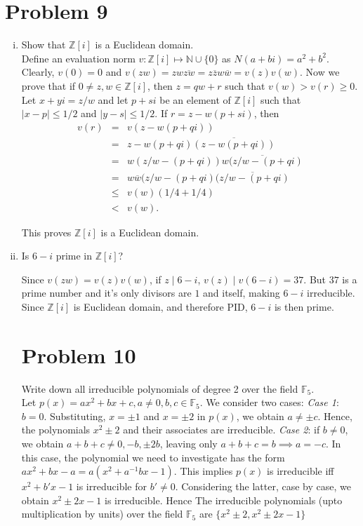 \documentclass[12pt]{article}
\begin{document}
\section*{Problem 9}
\begin{enumerate} [(i)]
    \item  Show that $\mathbb{Z}[i]$ is a Euclidean domain. \\ 

    \noindent Define an evaluation norm $v:\mathbb{Z}[i] \mapsto \mathbb{N} \cup \{0\}$ as $N(a + bi) = a^2 + b^2.$ Clearly, $v (0) = 0$ and $v(zw) = zw\overline{zw} = z\overline{z}w\overline{w} = v(z)v(w)$. Now we prove that if  $0 \neq z, w \in \mathbb{Z}[i]$, then $z = qw + r$ such that $v(w) > v(r) \geq 0.$  Let $x + yi = z/w$ and let $p + si$ be an element of $\mathbb{Z}[i]$ such that $|x - p| \leq 1/2$ and  $|y - s| \leq 1/2$. If $r = z - w(p + si)$, then
    \begin{eqnarray*}
        v(r) & = & v(z - w(p + qi)) \\
         & = & z - w(p + qi)\overline{(z - w(p + qi))}\\
         & = & w(z/w - (p + qi))\overline{w(z/w - (p + qi)}\\
         & = & w\overline{w}(z/w - (p + qi)\overline{(z/w - (p + qi)}\\
         & \leq &v(w)(1/4  + 1/4)\\
         & < & v(w).
    \end{eqnarray*}

    This proves  $\mathbb{Z}[i]$ is a Euclidean domain.

    \item  Is $6 - i$ prime in $\mathbb{Z}[i]$?

    Since $v(zw) = v(z)v(w)$, if $z \mid 6 - i$, $v(z) \mid v(6 - i) = 37$. But $37$ is a prime number and it's only divisors are $1$ and itself, making $6 - i$ irreducible. Since $\mathbb{Z}[i]$ is Euclidean domain, and therefore PID, $6 - i$ is then prime.

    \newcommand{\bb}[2]{\mathbb{#1}_{#2}}
    \section*{Problem 10}
    Write down all irreducible polynomials of degree 2 over the field $\bb{F}{5}$.\\

    \noindent Let $p(x) = ax^2 + bx + c, a\neq 0, b, c \in \bb{F}{5}.$ We consider two cases: \textit{Case 1}: $b = 0$. Substituting, $x = \pm 1$ and $x = \pm2$ in $p(x)$, we obtain $a \neq \pm c$. Hence, the polynomials $x^2 \pm 2$ and their associates are irreducible. \textit{Case 2}: if $b \neq 0$, we obtain $a + b + c \neq 0, -b, \pm 2b$, leaving only $a + b + c = b \implies a = -c$. In this case, the polynomial we need to investigate has the form $ax^2 + bx - a = a(x^2 + a^{-1}bx - 1)$. This implies $p(x)$ is irreducible iff $x^2 + b'x - 1$ is irreducible for $b' \neq 0.$ Considering the latter, case by case, we obtain $x^2 \pm2x -1 $ is irreducible. Hence The irreducible polynomials (upto multiplication by units) over the field $\bb{F}{5}$ are $\{ x^2 \pm  2, x^2 \pm 2x - 1\}$

\end{enumerate}
\end{document}
